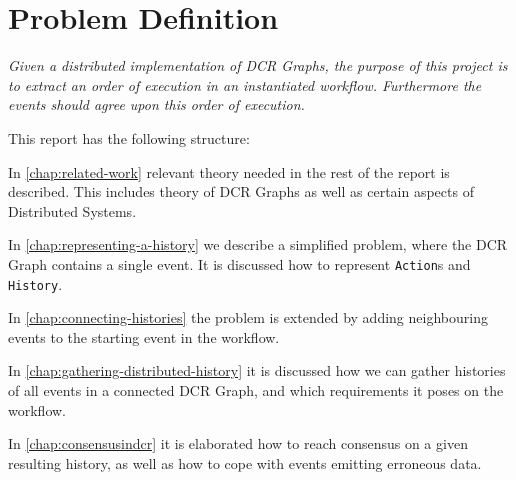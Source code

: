 \section{Problem Definition} %
	\textit{Given a distributed implementation of DCR Graphs, the purpose of this project is to extract an order of execution in an instantiated workflow. Furthermore the events should agree upon this order of execution.}
	
	\vspace{1cm}
	
	\newpar
	This report has the following structure:
	
	\newpar
	In \autoref{chap:related-work} relevant theory needed in the rest of the report is described. This includes theory of DCR Graphs as well as certain aspects of Distributed Systems. 
	
	\newpar
	In \autoref{chap:representing-a-history} we describe a simplified problem, where the DCR Graph contains a single event. It is discussed how to represent \texttt{Action}s and \texttt{History}. 
	
	\newpar
	In \autoref{chap:connecting-histories} the problem is extended by adding neighbouring events to the starting event in the workflow. 
	
	\newpar
	In \autoref{chap:gathering-distributed-history} it is discussed how we can gather histories of all events in a connected DCR Graph, and which requirements it poses on the workflow. 
	
	\newpar
	In \autoref{chap:consensusindcr} it is elaborated how to reach consensus on a given resulting history, as well as how to cope with events emitting erroneous data.